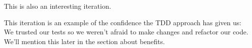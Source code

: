 This is also an interesting iteration.

This iteration is an example of the confidence the TDD approach has given us:
We trusted our tests so we weren't afraid to make changes and refactor our code.
We'll mention this later in the section about benefits.




